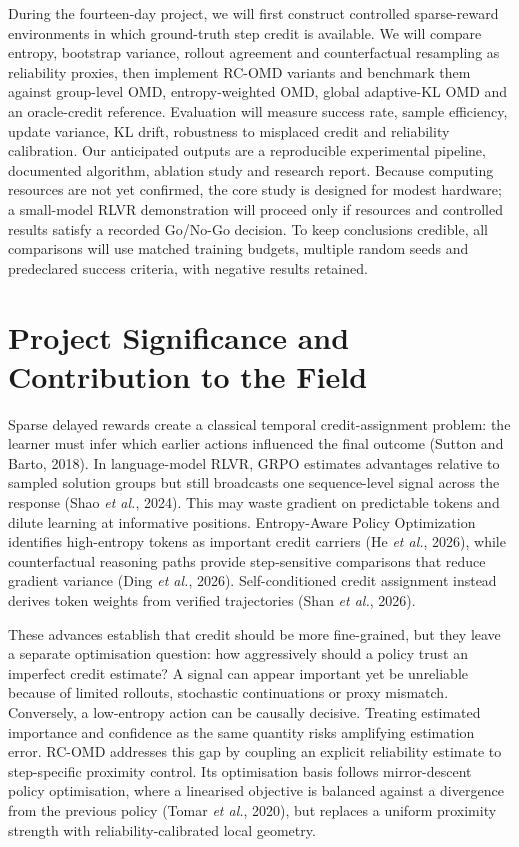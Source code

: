 \documentclass[11pt,a4paper]{article}
\begin{document}
During the fourteen-day project, we will first construct controlled sparse-reward environments in which ground-truth step credit is available. We will compare entropy, bootstrap variance, rollout agreement and counterfactual resampling as reliability proxies, then implement RC-OMD variants and benchmark them against group-level OMD, entropy-weighted OMD, global adaptive-KL OMD and an oracle-credit reference. Evaluation will measure success rate, sample efficiency, update variance, KL drift, robustness to misplaced credit and reliability calibration. Our anticipated outputs are a reproducible experimental pipeline, documented algorithm, ablation study and research report. Because computing resources are not yet confirmed, the core study is designed for modest hardware; a small-model RLVR demonstration will proceed only if resources and controlled results satisfy a recorded Go/No-Go decision. To keep conclusions credible, all comparisons will use matched training budgets, multiple random seeds and predeclared success criteria, with negative results retained.

\section*{Project Significance and Contribution to the Field}

Sparse delayed rewards create a classical temporal credit-assignment problem: the learner must infer which earlier actions influenced the final outcome (Sutton and Barto, 2018). In language-model RLVR, GRPO estimates advantages relative to sampled solution groups but still broadcasts one sequence-level signal across the response (Shao \textit{et al.}, 2024). This may waste gradient on predictable tokens and dilute learning at informative positions. Entropy-Aware Policy Optimization identifies high-entropy tokens as important credit carriers (He \textit{et al.}, 2026), while counterfactual reasoning paths provide step-sensitive comparisons that reduce gradient variance (Ding \textit{et al.}, 2026). Self-conditioned credit assignment instead derives token weights from verified trajectories (Shan \textit{et al.}, 2026).

These advances establish that credit should be more fine-grained, but they leave a separate optimisation question: how aggressively should a policy trust an imperfect credit estimate? A signal can appear important yet be unreliable because of limited rollouts, stochastic continuations or proxy mismatch. Conversely, a low-entropy action can be causally decisive. Treating estimated importance and confidence as the same quantity risks amplifying estimation error. RC-OMD addresses this gap by coupling an explicit reliability estimate to step-specific proximity control. Its optimisation basis follows mirror-descent policy optimisation, where a linearised objective is balanced against a divergence from the previous policy (Tomar \textit{et al.}, 2020), but replaces a uniform proximity strength with reliability-calibrated local geometry.
\end{document}
